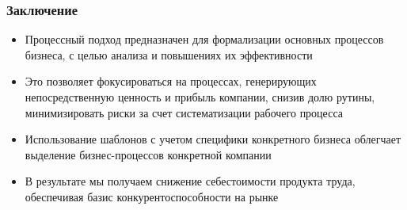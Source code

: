 \documentclass{../industrial-development}
\begin{document}
\begin{frame} \frametitle{Заключение}
	\begin{itemize}
		\item Процессный подход предназначен для формализации основных процессов бизнеса, с целью анализа и повышениях их эффективности
		\item Это позволяет фокусироваться на процессах, генерирующих непосредственную ценность и прибыль компании, снизив долю рутины, минимизировать риски за счет систематизации рабочего процесса
		\item Использование шаблонов с учетом специфики конкретного бизнеса облегчает выделение бизнес-процессов конкретной компании
		\item В результате мы получаем снижение себестоимости продукта труда, обеспечивая базис конкурентоспособности на рынке
	\end{itemize}
\end{frame}
\lecturenotes


%  


\end{document}
